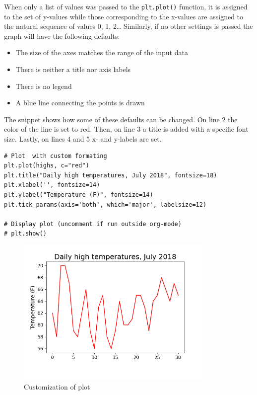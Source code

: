 \documentclass[10pt]{book}
\begin{document}
When only a list of values was passed to the \texttt{plt.plot()} function, it is assigned to the set of y-values while those corresponding to the x-values are assigned to the natural sequence of values 0, 1, 2\ldots{} Similarly, if no other settings is passed the graph will have the following defaults:
\begin{itemize}
\item The size of the axes matches the range of the input data
\item There is neither a title nor axis labels
\item There is no legend
\item A blue line connecting the points is drawn
\end{itemize}

The snippet shows how some of these defaults can be changed. On line 2 the color of the line is set to red. Then, on line 3 a title is added with a specific font size. Lastly, on lines 4 and 5 x- and y-labels are set. 

\label{org79dca35}
\begin{verbatim}
# Plot  with custom formating
plt.plot(highs, c="red")
plt.title("Daily high temperatures, July 2018", fontsize=18)
plt.xlabel('', fontsize=14)
plt.ylabel("Temperature (F)", fontsize=14)
plt.tick_params(axis='both', which='major', labelsize=12)

# Display plot (uncomment if run outside org-mode)
# plt.show()
\end{verbatim}

\begin{figure}[!ht]
\centering
\includegraphics[width=0.85\textwidth]{output/images/High_temp2.png}
\caption{\label{fig:orgade0676}Customization of plot}
\end{figure}
\end{document}
